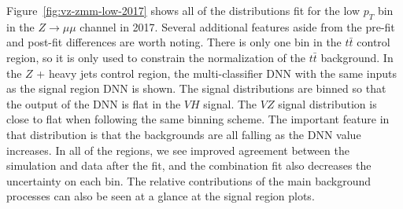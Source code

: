 Figure~\ref{fig:vz-zmm-low-2017} shows all of the distributions fit for the low $p_T$ bin in the
$Z\rightarrow\mu\mu$ channel in 2017.
Several additional features aside from the pre-fit and post-fit differences are worth noting.
There is only one bin in the $t\bar{t}$ control region,
so it is only used to constrain the normalization of the $t\bar{t}$ background.
In the $Z$ + heavy jets control region,
the multi-classifier DNN  with the same inputs as the signal region DNN is shown.
The signal distributions are binned so that the output of the DNN is flat in the $V\!H$ signal.
The $V\!Z$ signal distribution is close to flat when following the same binning scheme.
The important feature in that distribution is that the backgrounds are all falling as the DNN value increases.
In all of the regions, we see improved agreement between the simulation and data after the fit, and
the combination fit also decreases the uncertainty on each bin.
The relative contributions of the main background processes can also be seen at a glance at the signal region plots.
%
